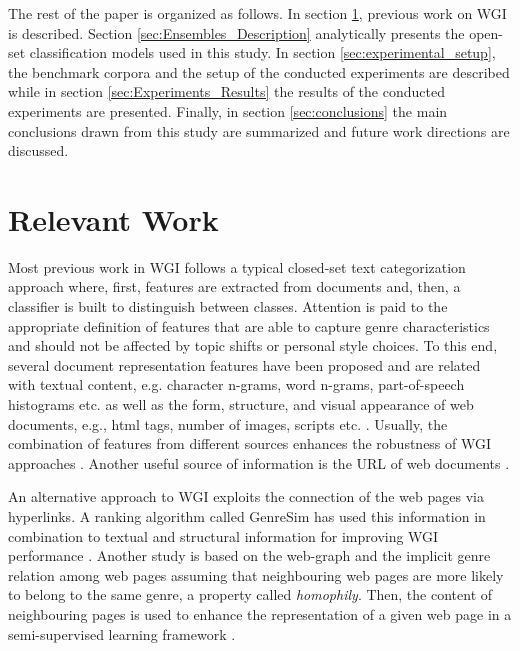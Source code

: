 \documentclass[runningheads]{llncs}
\begin{document}
The rest of the paper is organized as follows. In section \ref{sec:previous_work}, previous work on WGI is described. Section \ref{sec:Ensembles_Description} analytically presents the open-set classification models used in this study. In section \ref{sec:experimental_setup}, the  benchmark corpora and the setup of the conducted experiments are described while in section \ref{sec:Experiments_Results} the results of the conducted experiments are presented. Finally, in section \ref{sec:conclusions} the main conclusions drawn from this study are summarized and future work directions are discussed.

\section{Relevant Work}\label{sec:previous_work}

Most previous work in WGI follows a typical closed-set text categorization approach where, first, features are extracted from documents and, then, a classifier is built to distinguish between classes. Attention is paid to the appropriate definition of features that are able to capture genre characteristics and should not be affected by topic shifts or personal style choices.  To this end, several document representation features have been proposed and are related with textual content, e.g. character n-grams, word n-grams, part-of-speech histograms etc. \citep{kumari2014web,petrenz2011stable,mason2009n,sharoff2010web} as well as the form, structure, and visual appearance of web documents, e.g., html tags, number of images, scripts etc. \citep{Lim2005,levering2008using}. Usually, the combination of features from different sources enhances the robustness of WGI approaches \citep{levering2008using,kanaris2009learning}. Another useful source of information is the URL of web documents  \citep{abramson2012_URL,jebari2014pure_URL,priyatam2013don_URL}.

An alternative approach to WGI exploits the connection of the web pages via hyperlinks. A ranking algorithm called GenreSim has used this information in combination to textual and structural information for improving WGI performance \citep{zhu2011enhance}. Another study is based on the web-graph and the implicit genre relation among web pages assuming that neighbouring web pages are more likely to belong to the same genre, a property called \textit{homophily}. Then, the content of neighbouring pages is used to enhance the representation of a given web page in a semi-supervised learning framework \citep{asheghi2014semi}.
\end{document}
